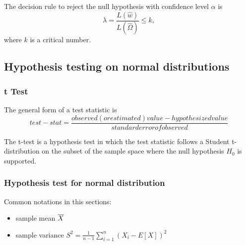 \begin{refsection}
\begin{definition}
The decision rule to reject the null hypothesis with confidence level $\alpha$ is 
$$\lambda  = \frac{L(\hat{w})}{L(\hat{\Omega})} \leq k,$$
where $k$ is a critical number. 
\end{definition}


\subsection{Hypothesis testing on normal distributions}
\subsubsection{t Test}
\begin{definition}
	The general form of a test statistic is
	$$test-stat = \frac{observed(or estimated) value - hypothesized value}{standard error of observed}$$
\end{definition}



\begin{definition}[t-Test]
	The t-test is a hypothesis test in which the test statistic follows a Student t-distribution on the subset of the sample space where the null hypothesis $H_0$ is supported.
\end{definition}



\subsubsection{Hypothesis test for normal distribution}

\begin{mdframed}
	Common notations in this sections:
	\begin{itemize}
		\item sample mean $\overline{X}$
		\item sample variance $S^2 = \frac{1}{n-1} \sum_{i=1}^{n} (X_i - E[X])^2$
	\end{itemize}
\end{mdframed}



\end{refsection}
